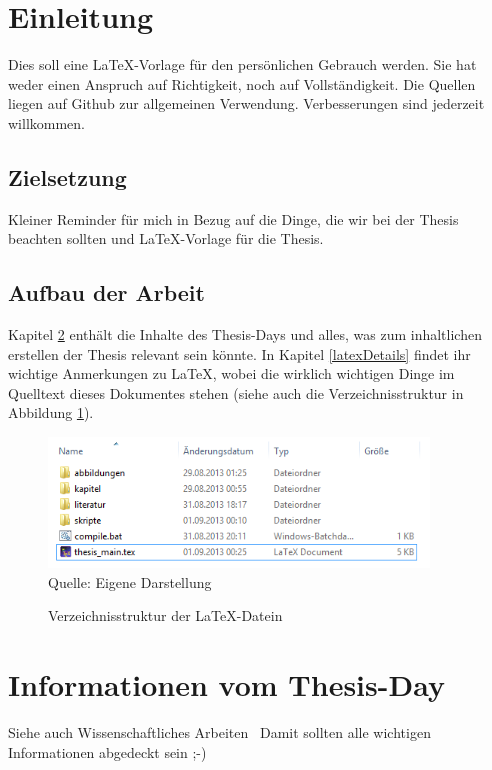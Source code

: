 \documentclass[12pt,oneside,titlepage]{scrartcl}
\begin{document}
\section{Einleitung} %
Dies soll eine \LaTeX{}-Vorlage für den persönlichen Gebrauch werden. Sie hat weder einen Anspruch auf Richtigkeit, noch auf Vollständigkeit. Die Quellen liegen auf Github zur allgemeinen Verwendung. Verbesserungen sind jederzeit willkommen.

\subsection{Zielsetzung}
Kleiner Reminder für mich in Bezug auf die Dinge, die wir bei der Thesis beachten sollten und \LaTeX{}-Vorlage für die Thesis.

\subsection{Aufbau der Arbeit}
Kapitel \ref{infos} enthält die Inhalte des Thesis-Days und alles, was zum inhaltlichen erstellen der Thesis relevant sein könnte. In Kapitel \ref{latexDetails}  findet ihr wichtige Anmerkungen zu \LaTeX{}, wobei die wirklich wichtigen Dinge im Quelltext dieses Dokumentes stehen (siehe auch die Verzeichnisstruktur in Abbildung \ref{fig:verzeichnisStruktur}).


\begin{figure}[H]
\caption{Verzeichnisstruktur der \LaTeX{}-Datein}\label{fig:verzeichnisStruktur}
\includegraphics[width=0.9\textwidth]{verzeichnisStruktur}
\\
Quelle: Eigene Darstellung
\end{figure}


\newpage
\section{Informationen vom Thesis-Day} \label{infos}
Siehe auch Wissenschaftliches Arbeiten~ Damit sollten alle wichtigen Informationen abgedeckt sein ;-)
\end{document}
